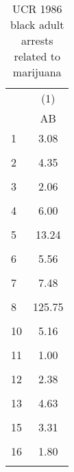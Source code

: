\begin{table}[htbp]\centering
\caption{UCR 1986 black adult arrests related to marijuana }
\begin{tabular}{l*{1}{c}}
\hline\hline
                    &\multicolumn{1}{c}{(1)}\\
                    &\multicolumn{1}{c}{AB}\\
\hline
1                   &        3.08\\
                    &            \\
[1em]
2                   &        4.35\\
                    &            \\
[1em]
3                   &        2.06\\
                    &            \\
[1em]
4                   &        6.00\\
                    &            \\
[1em]
5                   &       13.24\\
                    &            \\
[1em]
6                   &        5.56\\
                    &            \\
[1em]
7                   &        7.48\\
                    &            \\
[1em]
8                   &      125.75\\
                    &            \\
[1em]
10                  &        5.16\\
                    &            \\
[1em]
11                  &        1.00\\
                    &            \\
[1em]
12                  &        2.38\\
                    &            \\
[1em]
13                  &        4.63\\
                    &            \\
[1em]
15                  &        3.31\\
                    &            \\
[1em]
16                  &        1.80\\
                    &            \\
[1em]

\end{tabular}
\end{table}
